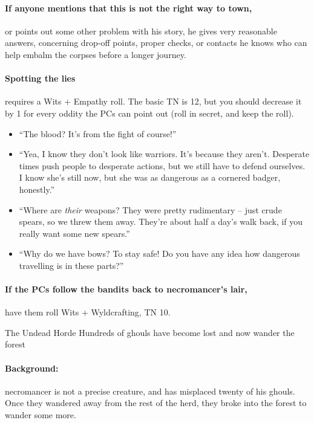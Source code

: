 \begin{multicols}{2}
\paragraph{If anyone mentions that this is not the right way to \gls{town},}
or points out some other problem with his story, he gives very reasonable answers, concerning drop-off points, proper checks, or contacts he knows who can help embalm the corpses before a longer journey.

\paragraph{Spotting the lies}
requires a Wits + Empathy roll.
The basic TN is 12, but you should decrease it by 1 for every oddity the PCs can point out (roll in secret, and keep the roll).

\begin{itemize}
  \item
  ``The blood? It's from the fight of course!''
  \item
  ``Yea, I know they don't look like warriors.
  It's because they aren't.
  Desperate times push people to desperate actions, but we still have to defend ourselves.
  I know she's still now, but she was as dangerous as a cornered badger, honestly.''
  \item
  ``Where are \emph{their} weapons?
  They were pretty rudimentary -- just crude spears, so we threw them away.
  They're about half a day's walk back, if you really want some new spears.''
  \item
  ``Why do we have bows?
  To stay safe!
  Do you have any idea how dangerous travelling is in these parts?''
\end{itemize}

\banditking


\paragraph{If the PCs follow the bandits back to \gls{necromancer}'s lair,}
have them roll Wits + Wyldcrafting, TN 10.

{The Undead Horde}%
{Hundreds of ghouls have become lost and now wander the forest}%

\paragraph{Background:}
\Gls{necromancer} is not a precise creature, and has misplaced twenty of his ghouls.
Once they wandered away from the rest of the herd, they broke into the forest to wander some more.


\end{multicols}
